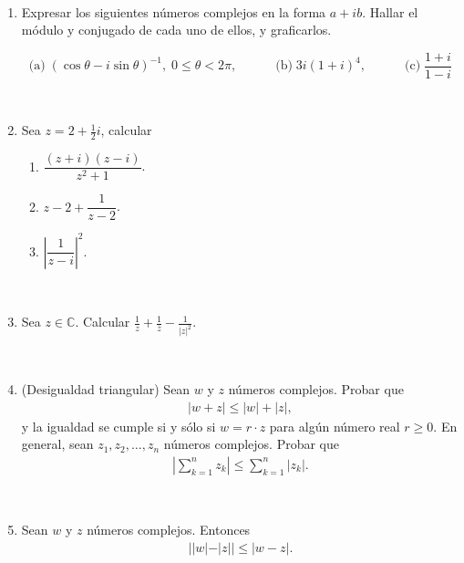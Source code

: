 \documentclass[12pt]{amsart}
\begin{document}
\

\begin{enumerate}[resume]

\item Expresar los siguientes n{\'u}meros complejos en la forma $a +i b$. Hallar el m{\'o}dulo y conjugado de cada uno de ellos, y graficarlos.

$$\textrm{(a)}\; (\cos\theta - i\sin\theta)^{-1},\; 0\leq\theta<2\pi, \quad \qquad
\textrm{(b)} \; 3 i(1 + i)^4, \quad \qquad
\textrm{(c)} \; \dfrac{1+i}{1-i}$$


\

  \item Sea $z=2+\frac{1}{2}i$, calcular
 \begin{multicols}{3}
\begin{enumerate}
\item $\dfrac{(z+i)(z-i)}{z^2+1}$.
\item $z-2 + \dfrac{1}{z-2}$.
\item $\left|\dfrac{1}{z-i}\right|^2$.
\end{enumerate}
\end{multicols}

\

\item Sea $z\in\mathbb{C}$. Calcular $\frac{1}{z}+\frac{1}{\overline{z}} - \frac{1}{|z|^2}$.

%

\

\item\label{desT} (Desigualdad triangular) Sean $w$ y $z$ n\'umeros complejos. Probar que
\begin{eqnarray*}
  |w + z| \leq |w| + |z|,
\end{eqnarray*}
y la igualdad se cumple si y s\'olo si $w= r\cdot z$ para alg\'un n\'umero real $r \geq 0$.
En general, sean $z_1,z_2,\ldots, z_n$ n\'umeros complejos. Probar que
\begin{eqnarray*}
  \left|\sum_{k=1}^{n} z_k\right| \leq \sum_{k=1}^{n} |z_k|.
\end{eqnarray*}

\

\item Sean $w$ y $z$ n\'umeros complejos. Entonces
\begin{eqnarray*}
  ||w|-|z|| \leq |w-z|.
\end{eqnarray*}

\end{enumerate}
\end{document}

